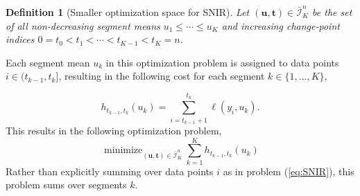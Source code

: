 \documentclass{article}
\newtheorem{lemma}{Lemma}
\newtheorem{definition}{Definition}
\DeclareMathOperator*{\minimize}{minimize}
\begin{document}
\begin{definition}[Smaller optimization space for SNIR]
\label{def:Ibar}
  Let $(\mathbf u, \mathbf t)\in\bar{\mathcal I}^n_K$ be the set of
  all non-decreasing segment means $u_1\leq\cdots\leq u_K$ and
  increasing change-point indices $0=t_0<t_1<\cdots<t_{K-1}<t_K=n$.
\end{definition}

Each segment mean $u_k$ in this optimization problem is assigned to
data points $i\in(t_{k-1},t_k]$, resulting in the following cost
for each segment $k\in\{1, \dots, K\}$,

\begin{equation}
  \label{eq:h}
  h_{t_{k-1}, t_k}(u_k) = \sum_{i=t_{k-1}+1}^{t_k} \ell(y_i, u_k).
\end{equation}
This results in the following optimization problem,
\begin{equation}
  \label{eq:isotonic_ut}
  \minimize_{(\mathbf u, \mathbf t)\in\bar{\mathcal I}^n_K}
  \sum_{k=1}^K
  h_{t_{k-1}, t_k}(u_k)
\end{equation}
Rather than explicitly summing over data points $i$ as in problem
(\ref{eq:SNIR}), this problem sums over segments $k$. 



\end{document}
